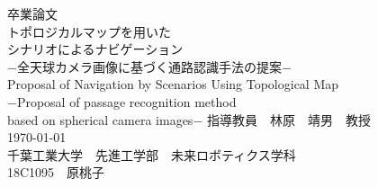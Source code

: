\documentclass[../main]{subfiles}
\begin{document}
  \begin{titlepage}
    \begin{center}
      {\huge  卒業論文}\\
      \vspace{2cm}
      {\huge トポロジカルマップを用いた\\シナリオによるナビゲーション\\
      \vspace{1cm}
      −全天球カメラ画像に基づく通路認識手法の提案−}\\
      \vspace{1cm}
     {\huge Proposal of Navigation by Scenarios Using Topological Map\\
     −Proposal of passage recognition method \\based on spherical camera images−}
      \vspace{2cm}
      {\LARGE 指導教員　林原　靖男　教授}\\
      \vspace{2cm}
      {\LARGE \today}\\
      \vspace{1cm}
      {\LARGE 千葉工業大学　先進工学部　未来ロボティクス学科}\\
      \vspace{1cm}
      {\LARGE 18C1095　原桃子}\\
    \end{center}
  \end{titlepage}
\end{document}
